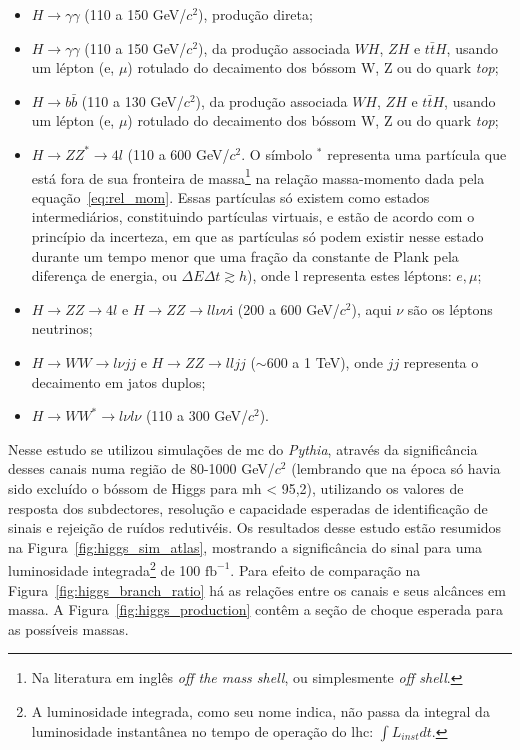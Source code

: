 \begin{itemize}
\item $H\rightarrow\gamma\gamma$ (110 a 150 GeV/$c^2$), produção direta;
\item $H\rightarrow\gamma\gamma$ (110 a 150 GeV/$c^2$), da produção associada $WH$, $ZH$ e
$t\bar{t}H$, usando um lépton (e, $\mu$) rotulado do decaimento dos bóssom W, Z ou
do quark \emph{top};
\item $H\rightarrow b\bar{b}$ (110 a 130 GeV/$c^2$), da produção associada $WH$, $ZH$ e
$t\bar{t}H$, usando um lépton (e, $\mu$) rotulado do decaimento dos bóssom W, Z ou
do quark \emph{top};
\item $H\rightarrow ZZ^*\rightarrow4l$ (110 a 600 GeV/$c^2$. O símbolo $^*$ representa uma partícula 
que está fora de sua fronteira de massa\footnote {Na literatura em inglês 
\emph{off the mass shell}, ou simplesmente \emph{off
shell}.} na relação massa-momento dada pela equação~\ref{eq:rel_mom}. Essas
partículas só existem como estados intermediários, constituindo partículas
virtuais, e estão de acordo com o princípio da incerteza, em que as partículas
só podem existir nesse estado durante um tempo menor que uma fração da
constante 
de Plank pela diferença de energia, ou $\Delta E \Delta t \gtrsim h$), onde l
representa estes léptons: $e,\mu$; 
\item $H\rightarrow ZZ\rightarrow4l$ e $H\rightarrow ZZ\rightarrow ll\nu\nu$i
(200 a 600 GeV/$c^2$), aqui $\nu$ são os léptons neutrinos;
\item $H\rightarrow WW\rightarrow l\nu jj$ e $H\rightarrow ZZ\rightarrow ll jj$
($\sim$600 a 1 TeV),
onde $jj$ representa o decaimento em jatos duplos;
\item $H\rightarrow WW^*\rightarrow l\nu l\nu$ (110 a 300 GeV/$c^2$). 
\end{itemize}


Nesse estudo se utilizou simulações
de \gls{mc} do \emph{Pythia}, através da significância desses 
canais numa região de 80-1000 GeV/$c^2$ (lembrando que na época só havia sido excluído
o bóssom de Higgs para \gls{mh} < 95,2), utilizando os valores de resposta dos
subdectores, resolução e capacidade esperadas de identificação de sinais e rejeição 
de ruídos redutivéis. 
Os resultados desse estudo estão resumidos na Figura~\ref{fig:higgs_sim_atlas},
mostrando a significância do sinal para uma luminosidade integrada\footnote{A 
luminosidade integrada, como seu nome indica, não passa da integral da luminosidade 
instantânea no tempo de operação do \gls{lhc}: $\int{L_{inst} dt}$.} de
100 $\text{fb}^{-1}$. Para efeito de comparação na
Figura~\ref{fig:higgs_branch_ratio} há as relações entre os canais
e seus alcânces em massa. A Figura~\ref{fig:higgs_production} contêm a seção
de choque esperada para as possíveis massas.

